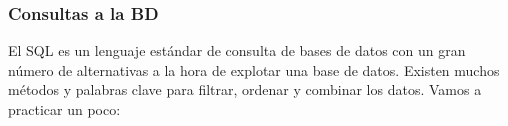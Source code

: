 \documentclass{classes/beamer_GeomaticaUA}
\begin{document}
\begin{frame}[fragile]
\frametitle{Consultas a la BD}

El SQL es un lenguaje estándar de consulta de bases de datos con un gran número de alternativas a la hora de explotar una base de datos. Existen muchos métodos y palabras clave para filtrar, ordenar y combinar los datos. Vamos a practicar un poco:



\end{frame}
\end{document}

